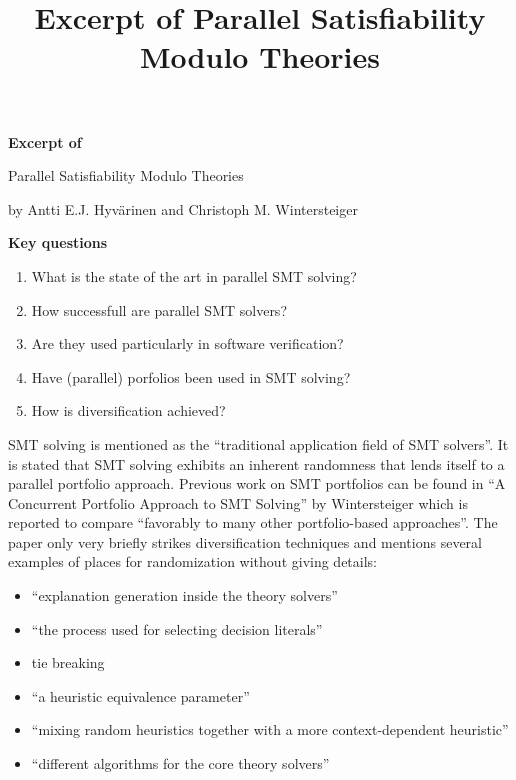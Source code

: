 \documentclass{scrartcl}
\title{Excerpt of Parallel Satisﬁability Modulo Theories}
\begin{document}
\begin{center}
    \Large{\textbf{Excerpt of}}

    \LARGE{Parallel Satisﬁability Modulo Theories}

    \large{by Antti E.J. Hyvärinen and Christoph M. Wintersteiger}
\end{center}

\vspace{1cm}

\begin{addmargin}[0.2\linewidth]{0.2\linewidth}
    \begin{center}
        \textbf{Key questions}
    \end{center}
    \begin{enumerate}[i]
        \item What is the state of the art in parallel SMT solving?
        \item How successfull are parallel SMT solvers?
        \item Are they used particularly in software verification?
        \item Have (parallel) porfolios been used in SMT solving?
        \item How is diversification achieved?
    \end{enumerate}
\end{addmargin}

\vspace{1cm}

SMT solving is mentioned as the \enquote{traditional application field of SMT solvers}.
It is stated that SMT solving exhibits an inherent randomness
that lends itself to a parallel portfolio approach.
Previous work on SMT portfolios can be found in
\enquote{A Concurrent Portfolio Approach to SMT Solving} by Wintersteiger
which is reported to compare \enquote{favorably to many other portfolio-based approaches}.
The paper only very briefly strikes diversification techniques
and mentions several examples of places for randomization without giving details:
\begin{itemize}
    \item \enquote{explanation generation inside the theory solvers}
    \item \enquote{the process used for selecting decision literals}
    \item tie breaking
    \item \enquote{a heuristic equivalence parameter}
    \item \enquote{mixing random heuristics together with a more context-dependent heuristic}
    \item \enquote{different algorithms for the core theory solvers}
\end{itemize}
\end{document}
